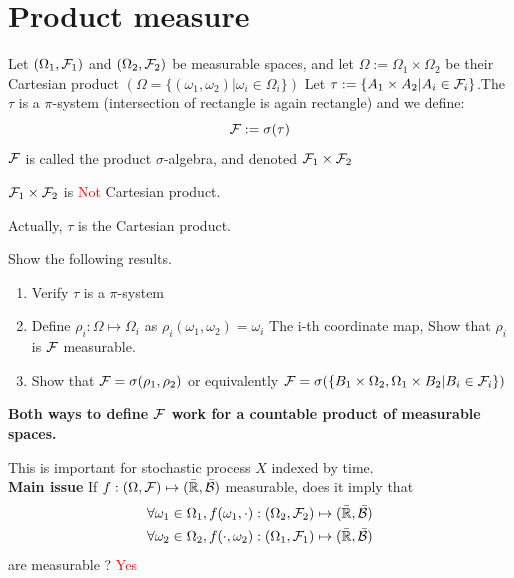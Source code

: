 \section{Product measure}
Let $(\Omega_1, \mathcal{F}_1)$ and $(\Omega_2, \mathcal{F}_2)$ be measurable spaces, and let $\Omega:= \Omega_1 \times \Omega_2$ be their Cartesian product $(\Omega = \{(\omega_1, \omega_2)|\omega_i \in \Omega_i\})$ Let $\tau:= \{A_1 \times A_2 | A_i\in \mathcal{F}_i\}$.The $\tau$ is a $\pi$-system (intersection of rectangle is again rectangle) and we define:
\begin{equation*}
    \mathcal{F} := \sigma(\tau)
\end{equation*}$\mathcal{F}$ is called the product $\sigma$-algebra, and denoted $\mathcal{F}_1 \times \mathcal{F}_2$
\begin{rem}
$\mathcal{F}_1 \times \mathcal{F}_2$ is \textcolor{red}{Not} Cartesian product.
\end{rem}
Actually, $\tau$ is the Cartesian product.
\begin{ex}
Show the following results.
\begin{enumerate}
    \item Verify $\tau$ is a $\pi$-system
    \item Define $\rho_i : \Omega \mapsto \Omega_i$ as $\rho_i(\omega_1, \omega_2) = \omega_i$ The i-th coordinate map, Show that $\rho_i$ is $\mathcal{F}$ measurable.
    \item Show that $\mathcal{F} = \sigma(\rho_1,\rho_2)$ or equivalently $\mathcal{F} = \sigma(\{B_1\times \Omega_2, \Omega_1\times B_2|B_i \in \mathcal{F}_i \})$
\end{enumerate}
\end{ex}
\begin{rem}
\textbf{Both ways to define $\mathcal{F}$ work for a countable product of measurable spaces.}
\end{rem}This is important for stochastic process $X$ indexed by time. \\[0.5cm]
\textbf{Main issue} If $f: (\Omega, \mathcal{F}) \mapsto (\bar{\mathbb{R}}, \bar{\mathcal{B}})$ measurable, does it imply that 
\begin{align*}
    \forall \omega_1 \in \Omega_1, f(\omega_1, \cdot): (\Omega_2, \mathcal{F}_2) \mapsto (\bar{\mathbb{R}}, \bar{\mathcal{B}}) \\
    \forall \omega_2 \in \Omega_2, f(\cdot,\omega_2): (\Omega_1, \mathcal{F}_1) \mapsto (\bar{\mathbb{R}}, \bar{\mathcal{B}})
\end{align*} are measurable ? \textcolor{red}{Yes}

